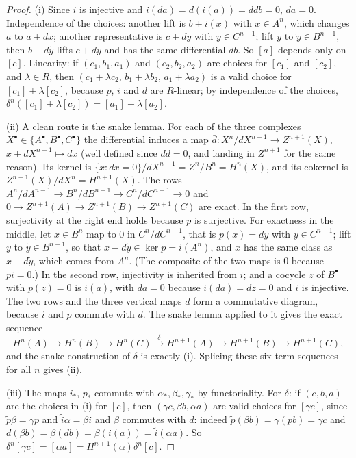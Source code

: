 \begin{proof}
(i) Since $i$ is injective and $i(da)=d(i(a))=ddb=0$, $da=0$. Independence of the choices: another lift is $b+i(x)$ with $x\in A^n$, which changes $a$ to
$a+dx$; another representative is $c+dy$ with $y\in C^{n-1}$; lift $y$ to $\tilde y\in B^{n-1}$, then $b+d\tilde y$ lifts $c+dy$ and has the same
differential $db$. So $[a]$ depends only on $[c]$. Linearity: if $(c_1,b_1,a_1)$ and $(c_2,b_2,a_2)$ are choices for $[c_1]$ and $[c_2]$, and
$\lambda\in R$, then $(c_1+\lambda c_2,\,b_1+\lambda b_2,\,a_1+\lambda a_2)$ is a valid choice for $[c_1]+\lambda[c_2]$, because $p$, $i$ and $d$ are $R$-linear; by
independence of the choices, $\delta^n([c_1]+\lambda[c_2])=[a_1]+\lambda[a_2]$.

(ii) A clean route is the snake lemma. For each of the three complexes $X^\bullet\in\{A^\bullet,B^\bullet,C^\bullet\}$ the differential induces a map
$\bar d\colon X^n/dX^{n-1}\to Z^{n+1}(X)$, $x+dX^{n-1}\mapsto dx$ (well defined since $dd=0$, and landing in $Z^{n+1}$ for the same reason). Its kernel is
$\{x:dx=0\}/dX^{n-1}=Z^n/B^n=H^n(X)$, and its cokernel is $Z^{n+1}(X)/dX^{n}=H^{n+1}(X)$. The rows
$A^n/dA^{n-1}\to B^n/dB^{n-1}\to C^n/dC^{n-1}\to0$ and $0\to Z^{n+1}(A)\to Z^{n+1}(B)\to Z^{n+1}(C)$ are exact. In the first row, surjectivity at the right end holds
because $p$ is surjective. For exactness in the middle, let $x\in B^n$ map to $0$ in $C^n/dC^{n-1}$, that is $p(x)=dy$ with $y\in C^{n-1}$; lift $y$ to $\tilde y\in B^{n-1}$, so
that $x-d\tilde y\in\ker p=i(A^n)$, and $x$ has the same class as $x-d\tilde y$, which comes from $A^n$. (The composite of the two maps is $0$ because $pi=0$.) In the
second row, injectivity is inherited from $i$; and a cocycle $z$ of $B^\bullet$ with $p(z)=0$ is $i(a)$, with $da=0$ because $i(da)=dz=0$ and $i$ is injective. The two
rows and the three vertical maps $\bar d$ form a commutative diagram, because $i$ and $p$ commute with $d$. The snake lemma applied to it gives the exact sequence
\[
H^n(A)\to H^n(B)\to H^n(C)\xrightarrow{\ \delta\ }H^{n+1}(A)\to H^{n+1}(B)\to H^{n+1}(C),
\]
and the snake construction of $\delta$ is exactly (i). Splicing these six-term sequences for all $n$ gives (ii).

(iii) The maps $i_*$, $p_*$ commute with $\alpha_*,\beta_*,\gamma_*$ by functoriality. For $\delta$: if $(c,b,a)$ are the choices in (i) for $[c]$, then
$(\gamma c,\beta b,\alpha a)$ are valid choices for $[\gamma c]$, since $\tilde p\beta=\gamma p$ and $\tilde i\alpha=\beta i$ and $\beta$ commutes with $d$:
indeed $\tilde p(\beta b)=\gamma(pb)=\gamma c$ and $d(\beta b)=\beta(db)=\beta(i(a))=\tilde i(\alpha a)$. So $\delta^n[\gamma c]=[\alpha a]=H^{n+1}(\alpha)\delta^n[c]$.
\end{proof}

